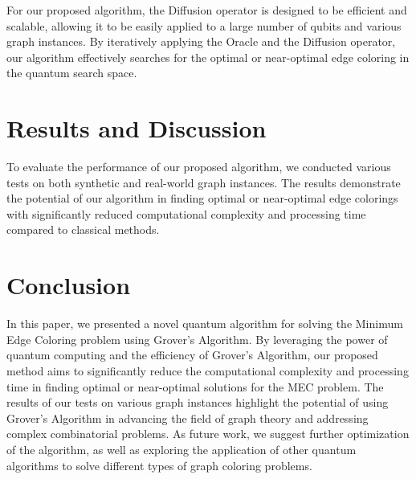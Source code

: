 For our proposed algorithm, the Diffusion operator is designed to be efficient and scalable, allowing it to be easily applied to a large number of qubits and various graph instances. By iteratively applying the Oracle and the Diffusion operator, our algorithm effectively searches for the optimal or near-optimal edge coloring in the quantum search space.

\section{Results and Discussion}\label{sec:results}

To evaluate the performance of our proposed algorithm, we conducted various tests on both synthetic and real-world graph instances. The results demonstrate the potential of our algorithm in finding optimal or near-optimal edge colorings with significantly reduced computational complexity and processing time compared to classical methods.

\section{Conclusion}\label{sec:conclusion}

In this paper, we presented a novel quantum algorithm for solving the Minimum Edge Coloring problem using Grover's Algorithm. By leveraging the power of quantum computing and the efficiency of Grover's Algorithm, our proposed method aims to significantly reduce the computational complexity and processing time in finding optimal or near-optimal solutions for the MEC problem. The results of our tests on various graph instances highlight the potential of using Grover's Algorithm in advancing the field of graph theory and addressing complex combinatorial problems. As future work, we suggest further optimization of the algorithm, as well as exploring the application of other quantum algorithms to solve different types of graph coloring problems.

